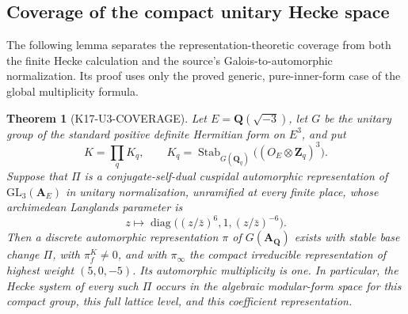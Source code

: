 \documentclass[11pt,a4paper]{article}
\newtheorem{theorem}{Theorem}[section]
\theoremstyle{definition}
\begin{document}
\subsection{Coverage of the compact unitary Hecke space}
\label{sec:u3-coverage}

The following lemma separates the representation-theoretic coverage from
both the finite Hecke calculation and the source's Galois-to-automorphic
normalization. Its proof uses only the proved generic, pure-inner-form case
of the global multiplicity formula.

\begin{theorem}[K17-U3-COVERAGE]\label{thm:u3-coverage}
Let $E=\mathbf Q(\sqrt{-3})$, let $G$ be the unitary group of the standard
positive definite Hermitian form on $E^3$, and put
\[
 K=\prod_q K_q,\qquad
 K_q=\operatorname{Stab}_{G(\mathbf Q_q)}
       \bigl((O_E\otimes\mathbf Z_q)^3\bigr).
\]
Suppose that $\Pi$ is a conjugate-self-dual cuspidal automorphic
representation of $\mathrm{GL}_3(\mathbf A_E)$ in unitary normalization,
unramified at every finite place, whose archimedean Langlands parameter is
\[
 z\longmapsto
 \operatorname{diag}\bigl((z/\bar z)^6,1,(z/\bar z)^{-6}\bigr).
\]
Then a discrete automorphic representation $\pi$ of $G(\mathbf A_\mathbf Q)$
exists with stable base change $\Pi$, with $\pi_f^K\ne0$, and with
$\pi_\infty$ the compact irreducible representation of highest weight
$(5,0,-5)$. Its automorphic multiplicity is one. In particular, the Hecke
system of every such $\Pi$ occurs in the algebraic modular-form space for
this compact group, this full lattice level, and this coefficient
representation.
\end{theorem}
\end{document}
